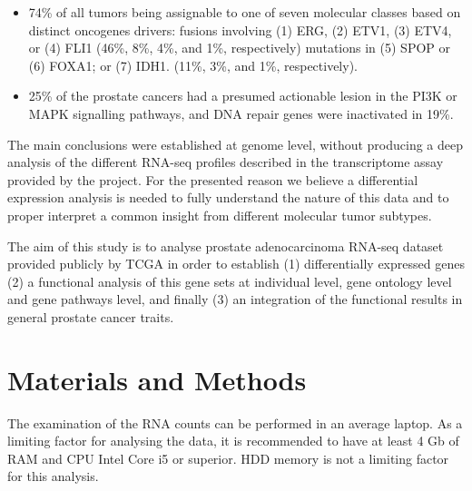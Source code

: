\documentclass[9pt,twocolumn,twoside]{gsajnl}
\begin{document}
\begin{itemize}
\item 74\% of all tumors being assignable to one of seven molecular classes based on distinct oncogenes drivers:
        fusions involving (1) ERG, (2) ETV1, (3) ETV4, or (4) FLI1 (46\%, 8\%, 4\%, and 1\%, respectively)
        mutations in (5) SPOP or (6) FOXA1; or (7) IDH1. (11\%, 3\%, and 1\%, respectively).
\item 25\% of the prostate cancers had a presumed actionable lesion in the PI3K or MAPK signalling pathways, and DNA repair genes were inactivated in 19\%.
\end{itemize}

The main conclusions were established at genome level, without producing a deep analysis of the different RNA-seq profiles described in the transcriptome assay provided by the project. For the presented reason we believe a differential expression analysis is needed to fully understand the nature of this data and to proper interpret a common insight from different molecular tumor subtypes.  

The aim of this study is to analyse prostate adenocarcinoma RNA-seq dataset provided publicly by TCGA in order to establish (1) differentially expressed genes (2) a functional analysis of this gene sets at individual level, gene ontology level and gene pathways level, and finally (3) an integration of the functional results in general prostate cancer traits. 

\section*{Materials and Methods}


The examination of the RNA counts can be performed in an average laptop. As a limiting factor for analysing the data, it is recommended to have at least 4 Gb of RAM and CPU Intel Core i5 or superior. HDD memory is not a limiting factor for this analysis.
\end{document}
